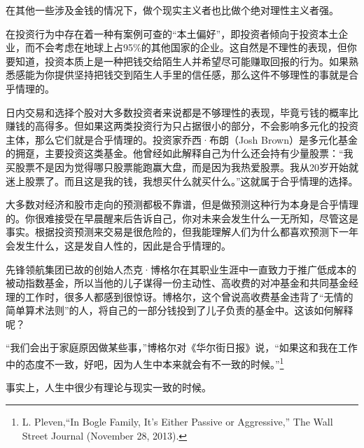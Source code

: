在其他一些涉及金钱的情况下，做个现实主义者也比做个绝对理性主义者强。

在投资行为中存在着一种有案例可查的“本土偏好”，即投资者倾向于投资本土企业，而不会考虑在地球上占95\%的其他国家的企业。这自然是不理性的表现，但你要知道，投资本质上是一种把钱交给陌生人并希望尽可能赚取回报的行为。如果熟悉感能为你提供坚持把钱交到陌生人手里的信任感，那么这件不够理性的事就是合乎情理的。

日内交易和选择个股对大多数投资者来说都是不够理性的表现，毕竟亏钱的概率比赚钱的高得多。但如果这两类投资行为只占据很小的部分，不会影响多元化的投资主体，那么它们就是合乎情理的。投资家乔西·布朗（Josh Brown）是多元化基金的拥趸，主要投资这类基金。他曾经如此解释自己为什么还会持有少量股票：“我买股票不是因为觉得哪只股票能跑赢大盘，而是因为我热爱股票。我从20岁开始就迷上股票了。而且这是我的钱，我想买什么就买什么。”这就属于合乎情理的选择。

大多数对经济和股市走向的预测都极不靠谱，但是做预测这种行为本身是合乎情理的。你很难接受在早晨醒来后告诉自己，你对未来会发生什么一无所知，尽管这是事实。根据投资预测来交易是很危险的，但我能理解人们为什么都喜欢预测下一年会发生什么，这是发自人性的，因此是合乎情理的。

先锋领航集团已故的创始人杰克·博格尔在其职业生涯中一直致力于推广低成本的被动指数基金，所以当他的儿子谋得一份主动性、高收费的对冲基金和共同基金经理的工作时，很多人都感到很惊讶。博格尔，这个曾说高收费基金违背了“无情的简单算术法则”的人，将自己的一部分钱投到了儿子负责的基金中。这该如何解释呢？

“我们会出于家庭原因做某些事，”博格尔对《华尔街日报》说，“如果这和我在工作中的态度不一致，好吧，因为人生中本来就会有不一致的时候。”\footnote{L. Pleven,“In Bogle Family, It’s Either Passive or Aggressive,” The Wall Street Journal (November 28, 2013).}

事实上，人生中很少有理论与现实一致的时候。
